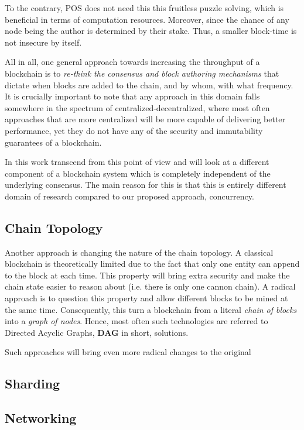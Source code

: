 To the contrary, POS does not need this this fruitless puzzle solving, which is beneficial in terms
of computation resources. Moreover, since the chance of any node being the author is determined by
their stake. Thus, a smaller block-time is not insecure by itself.

All in all, one general approach towards increasing the throughput of a blockchain is to
\textit{re-think the consensus and block authoring mechanisms} that dictate when blocks are added to
the chain, and by whom, with what frequency. It is crucially important to note that any approach in
this domain falls somewhere in the spectrum of centralized-decentralized, where most often
approaches that are more centralized will be more capable of delivering better performance, yet they
do not have any of the security and immutability guarantees of a blockchain.

In this work transcend from this point of view and will look at a different component of a
blockchain system which is completely independent of the underlying consensus. The main reason for
this is that this is entirely different domain of research compared to our proposed approach,
concurrency.

\subsection{Chain Topology}

Another approach is changing the nature of the chain topology. A classical blockchain is
theoretically limited due to the fact that only one entity can append to the block at each time.
This property will bring extra security and make the chain state easier to reason about (i.e. there
is only one cannon chain). A radical approach is to question this property and allow different
blocks to be mined at the same time. Consequently, this turn a blockchain from a literal
\textit{chain of blocks} into a \textit{graph of nodes}. Hence, most often such technologies are
referred to Directed Acyclic Graphs, \textbf{DAG} in short, solutions.

Such approaches will bring even more radical changes to the original

\subsection{Sharding}

\subsection{Networking}

